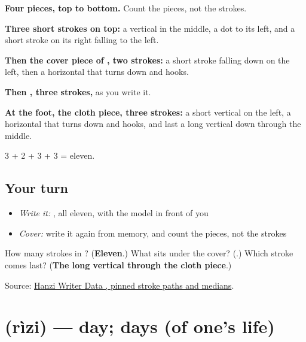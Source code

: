 \begin{quote}
\end{quote}

\textbf{Four pieces, top to bottom.} Count the pieces, not the strokes.

\textbf{Three short strokes on top:} a vertical in the middle, a dot to its left, and a short stroke on its right falling to the left.

\textbf{Then the cover piece of , two strokes:} a short stroke falling down on the left, then a horizontal that turns down and hooks.

\textbf{Then , three strokes,} as you write it.

\textbf{At the foot, the cloth piece, three strokes:} a short vertical on the left, a horizontal that turns down and hooks, and last a long vertical down through the middle.

3 + 2 + 3 + 3 = eleven.

\subsection*{Your turn}
\begin{itemize}
\raggedright
  \item \emph{Write it:} , all eleven, with the model in front of you
  \item \emph{Cover:} write it again from memory, and count the pieces, not the strokes
\end{itemize}

\begin{tcolorbox}[breakable,colback=teal!4,colframe=teal!35!black,title={Before you move on}]
How many strokes in ? (\textbf{Eleven}.) What sits under the cover? (\textbf{}.) Which stroke comes last? (\textbf{The long vertical through the cloth piece}.)

Source: \href{https://raw.githubusercontent.com/chanind/hanzi-writer-data/68d10a4b21150cae5e1ebbd223eed289cf32d90c/data/\%E5\%B8\%B8.json}{Hanzi Writer Data , pinned stroke paths and medians}.
\end{tcolorbox}
\section[\texorpdfstring{\zh{日子} (rìzi)}{日子 (rìzi)}]{ (rìzi) — day; days (of one's life)}

\label{lesson:ZH-C178-rizi}



